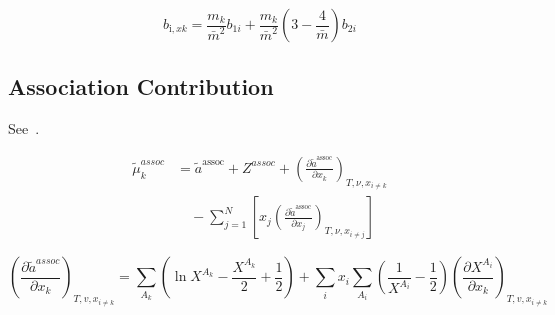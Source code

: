 \documentclass[12pt, letterpaper]{article}
\begin{document}

\begin{equation}
    b_{\mathrm{i},xk}=\frac{m_{k}}{\bar{m}^{2}}b_{1i}+\frac{m_{k}}{\bar{m}^{2}}\left(3-\frac{4}{\bar{m}}\right)b_{2i}
    \label{eq:b_i_xk}
\end{equation}

\subsection{Association Contribution}

See~\cite{Chapman1990}.

\begin{equation}
    \begin{aligned}
        \tilde{\mu}^{assoc}_{k}
        &=\tilde{a}^{\mathrm{assoc}} + Z^{assoc}
        +\left(\frac{\partial\tilde{a}^{\mathrm{assoc}}}{\partial x_{k}}\right)_{T,\nu,x_{i\neq k}}
        \\
        &\quad -\sum_{j=1}^{N}\left[x_{j}\left(\frac{\partial\tilde{a}^{\mathrm{assoc}}}{\partial x_{j}}\right)_{T,\nu,x_{i\neq j}}\right]
    \end{aligned}
    \label{eq:mu_assoc}
\end{equation}


\begin{equation}
    \left(\frac{\partial \tilde a^{assoc}}{\partial x_{k}}\right)_{T,v,x_{i\neq k}}
    =
    \sum_{A_{k}}\left(\ln X^{A_{k}}-\frac{X^{A_{k}}}{2}+\frac{1}{2}\right)
    +
    \sum_{i} x_{i}\sum_{A_{i}}
    \left(\frac{1}{X^{A_{i}}}-\frac{1}{2}\right)
    \left(\frac{\partial X^{A_{i}}}{\partial x_{k}}\right)_{T,v,x_{i\neq k}}
    \label{eq:dares_assoc_dxk}
\end{equation}
\end{document}
